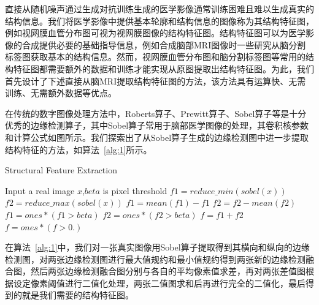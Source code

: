 \documentclass[letterpaper]{article} %
\begin{document}
直接从随机噪声通过生成对抗训练生成的医学影像通常训练困难且难以生成真实的结构信息。我们将医学影像中提供基本轮廓和结构信息的图像称为其结构特征图，例如视网膜血管分布图可视为视网膜图像的结构特征图\cite{41costa2017towards}。结构特征图可以为医学影像的合成提供必要的基础指导信息，例如合成脑部MRI图像时一些研究从脑分割标签图获取基本的结构信息\cite{4shin2018medical}。然而，视网膜血管分布图和脑分割标签图等常用的结构特征图都需要额外的数据和训练才能实现从原图提取出结构特征图。为此，我们首先设计了下述直接从脑MRI提取结构特征图的方法，该方法具有运算快、无需训练、无需额外数据等优点。

在传统的数字图像处理方法中，Roberts算子\cite{87Roberts}、Prewitt算子\cite{88prewitt}、Sobel算子\cite{89Sobel}等是十分优秀的边缘检测算子，其中Sobel算子常用于脑部医学图像的处理，其卷积核参数和计算公式如图所示。我们探索出了从Sobel算子生成的边缘检测图中进一步提取结构特征的方法，如算法~\ref{alg:1}所示。
\begin{algorithm}
	\caption{Structural Feature Extraction}
	\label{alg:1}
	\begin{algorithmic}[1]
		\State Input a real image $x$,$beta$ is pixel threshold
		\State $f1 = reduce\_min(sobel(x))$
		\State $f2 = reduce\_max(sobel(x))$
		\State $f1 = mean(f1) - f1$
		\State $f2 = f2 - mean(f2)$
		\State $f1 = ones * (f1 > beta)$
		\State $f2 = ones * (f2 > beta)$
		\State $f = f1 + f2$
		\State $f = ones * (f > 0.)$
	\end{algorithmic}  
\end{algorithm}

在算法~\ref{alg:1}中，我们对一张真实图像用Sobel算子提取得到其横向和纵向的边缘检测图，对两张边缘检测图进行最大值规约和最小值规约得到两张新的边缘检测融合图，然后两张边缘检测融合图分别与各自的平均像素值求差，再对两张差值图根据设定像素阈值进行二值化处理，两张二值图求和后再进行完全的二值化，最后得到的就是我们需要的结构特征图。
\end{document}

